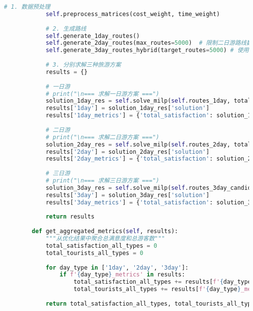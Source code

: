 \begin{lstlisting}[language=Python]
            # 1. 数据预处理
            self.preprocess_matrices(cost_weight, time_weight)
            
            # 2. 生成路线
            self.generate_1day_routes()
            self.generate_2day_routes(max_routes=5000)  # 限制二日游路线数量
            self.generate_3day_routes_hybrid(target_routes=5000) # 使用混合方法生成三日游路线
            
            # 3. 分别求解三种旅游方案
            results = {}
            
            # 一日游
            # print("\n=== 求解一日游方案 ===")
            solution_1day_res = self.solve_milp(self.routes_1day, total_tourists=tourists_1day)
            results['1day'] = solution_1day_res['solution']
            results['1day_metrics'] = {'total_satisfaction': solution_1day_res['total_satisfaction'], 'total_tourists': solution_1day_res['total_tourists']}
            
            # 二日游
            # print("\n=== 求解二日游方案 ===")
            solution_2day_res = self.solve_milp(self.routes_2day, total_tourists=tourists_2day)
            results['2day'] = solution_2day_res['solution']
            results['2day_metrics'] = {'total_satisfaction': solution_2day_res['total_satisfaction'], 'total_tourists': solution_2day_res['total_tourists']}
            
            # 三日游
            # print("\n=== 求解三日游方案 ===")
            solution_3day_res = self.solve_milp(self.routes_3day_candidates, total_tourists=tourists_3day)
            results['3day'] = solution_3day_res['solution']
            results['3day_metrics'] = {'total_satisfaction': solution_3day_res['total_satisfaction'], 'total_tourists': solution_3day_res['total_tourists']}
            
            return results
        
        def get_aggregated_metrics(self, results):
            """从优化结果中聚合总满意度和总游客数"""
            total_satisfaction_all_types = 0
            total_tourists_all_types = 0
    
            for day_type in ['1day', '2day', '3day']:
                if f'{day_type}_metrics' in results:
                    total_satisfaction_all_types += results[f'{day_type}_metrics']['total_satisfaction']
                    total_tourists_all_types += results[f'{day_type}_metrics']['total_tourists']
            
            return total_satisfaction_all_types, total_tourists_all_types
    

\end{lstlisting}
